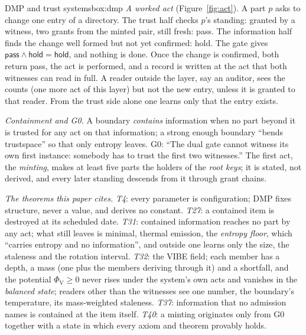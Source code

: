 \begin{primer}{DMP and trust systems}{box:dmp}
\emph{A worked act} (Figure~\ref{fig:act}). A part $p$ asks to change one entry of a directory. The trust half checks $p$'s standing:
granted by a witness, two grants from the minted pair, still fresh: \textsf{pass}. The information half finds the change well formed but
not yet confirmed: \textsf{hold}. The gate gives $\textsf{pass}\wedge\textsf{hold}=\textsf{hold}$, and nothing is done. Once the change is
confirmed, both return \textsf{pass}, the act is performed, and a record is written at the act that both witnesses can read in full. A
reader outside the layer, say an auditor, sees the counts (one more act of this layer) but not the new entry, unless it is granted to that
reader. From the trust side alone one learns only that the entry exists.

\emph{Containment and G0.} A boundary \emph{contains} information when no part beyond it is trusted for any act on that information; a
strong enough boundary ``bends trustspace'' so that only entropy leaves. G0: ``The dual gate cannot witness its own first instance:
somebody has to trust the first two witnesses.'' The first act, the \emph{minting}, makes at least five parts the holders of the
\emph{root keys}; it is stated, not derived, and every later standing descends from it through grant chains.

\emph{The theorems this paper cites.} \emph{T4}: every parameter is configuration; DMP fixes structure, never a value, and derives no
constant. \emph{T27}: a contained item is destroyed at its scheduled date. \emph{T31}: contained information reaches no part by any act;
what still leaves is minimal, thermal emission, the \emph{entropy floor}, which ``carries entropy and no information'', and outside one
learns only the size, the staleness and the rotation interval. \emph{T32}: the VIBE field; each member has a depth, a mass (one plus the
members deriving through it) and a shortfall, and the potential $\Phi_{\mathrm V}\ge0$ never rises under the system's own acts and vanishes
in the \emph{balanced state}; readers other than the witnesses see one number, the boundary's temperature, its mass-weighted staleness.
\emph{T37}: information that no admission names is contained at the item itself. \emph{T40}: a minting originates only from G0 together
with a state in which every axiom and theorem provably holds.
\end{primer}

